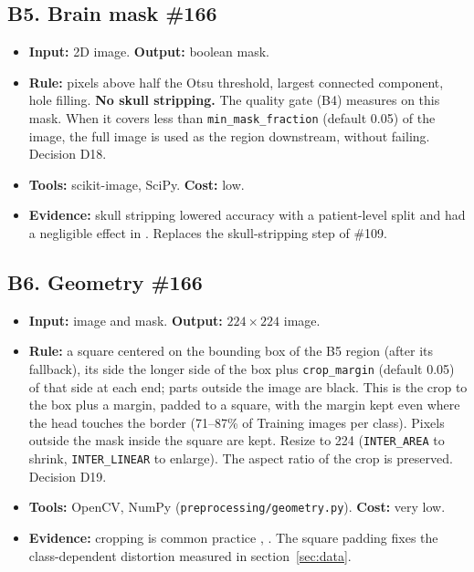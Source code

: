 \documentclass[11pt,a4paper]{article}
\newcommand{\board}[1]{\textsf{\##1}}
\begin{document}
\subsection*{B5. Brain mask \hfill \board{166}}
\begin{itemize}
  \item \textbf{Input:} 2D image. \textbf{Output:} boolean mask.
  \item \textbf{Rule:} pixels above half the Otsu threshold, largest connected component, hole filling. \textbf{No skull stripping.} The quality gate (B4) measures on this mask. When it covers less than \texttt{min\_mask\_fraction} (default 0.05) of the image, the full image is used as the region downstream, without failing. Decision D18.
  \item \textbf{Tools:} scikit-image, SciPy. \textbf{Cost:} low.
  \item \textbf{Evidence:} skull stripping lowered accuracy with a patient-level split \cite{r6} and had a negligible effect in \cite{r7}. Replaces the skull-stripping step of \board{109}.
\end{itemize}

\subsection*{B6. Geometry \hfill \board{166}}
\begin{itemize}
  \item \textbf{Input:} image and mask. \textbf{Output:} $224\times224$ image.
  \item \textbf{Rule:} a square centered on the bounding box of the B5 region (after its fallback), its side the longer side of the box plus \texttt{crop\_margin} (default 0.05) of that side at each end; parts outside the image are black. This is the crop to the box plus a margin, padded to a square, with the margin kept even where the head touches the border (71--87\% of Training images per class). Pixels outside the mask inside the square are kept. Resize to 224 (\texttt{INTER\_AREA} to shrink, \texttt{INTER\_LINEAR} to enlarge). The aspect ratio of the crop is preserved. Decision D19.
  \item \textbf{Tools:} OpenCV, NumPy (\texttt{preprocessing/geometry.py}). \textbf{Cost:} very low.
  \item \textbf{Evidence:} cropping is common practice \cite{r5}, \cite{r8}. The square padding fixes the class-dependent distortion measured in section~\ref{sec:data}.
\end{itemize}
\end{document}
